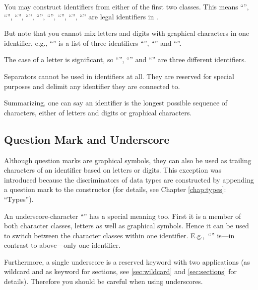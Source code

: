 You may construct identifiers from either of the first two classes.
This means ``'',
``'', \newline
``'', ``'', 
``'', ``\pro{+}'', ``\pro{\#}'', ``\pro{---->}'',
``\pro{\%!}'' are legal identifiers in \opal.

But note that you cannot mix letters and digits with graphical
characters in one identifier, e.g., ``'' is a
list of  three identifiers  ``'', ``'' and
``''.

\begin{sloppypar}
    The case of a letter is significant, so ``'',
``'' and  ``'' are three different
identifiers. 
\end{sloppypar}


\medskip
 Separators cannot be used in identifiers at all. They are
reserved for special purposes and delimit any identifier they are
connected to. 

Summarizing, one can say an identifier is the longest possible
sequence of characters,  either of letters and digits or graphical
characters.


\subsection{Question Mark and Underscore}
\label{sec:question mark}
\novice
Although question marks are graphical symbols, they can also be used
as trailing characters of an identifier based on letters or
digits. 
This exception was introduced because the discriminators of data types
are constructed by appending  a question mark to the constructor (for
details, see Chapter \ref{chap:types}: ``Types'').

\medskip
\advanced
An underscore-character ``\pro{\_}'' has a special meaning too.
First it is a member of both character classes, letters as well as
graphical symbols.
Hence it can be used to switch between the character classes
within one identifier. 
E.g.,~``'' is---in contrast to
above---only one identifier. 

Furthermore, a single underscore is a reserved keyword  with
two applications (as wildcard and as keyword for sections, see
\ref{sec:wildcard} and \ref{sec:sections} for details). 
Therefore you should be careful when using underscores.
%

